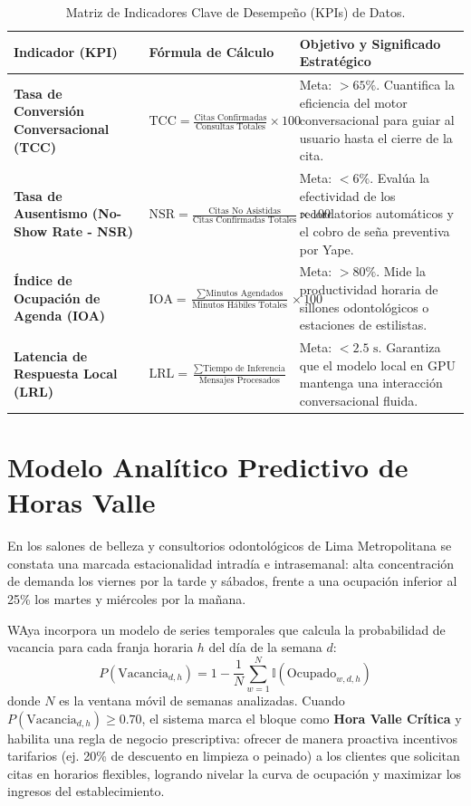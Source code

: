 \documentclass[12pt,a4paper]{report}
\begin{document}
\begin{table}[h!]
\centering
\small
\begin{tabularx}{\textwidth}{|p{3.5cm}|p{4.2cm}|X|}
\hline
\rowcolor{BrandPrimary!20}
\textbf{Indicador (KPI)} & \textbf{Fórmula de Cálculo} & \textbf{Objetivo y Significado Estratégico} \\
\hline
\textbf{Tasa de Conversión Conversacional (TCC)} & 
$\text{TCC} = \frac{\text{Citas Confirmadas}}{\text{Consultas Totales}} \times 100$ & 
Meta: $> 65\%$. Cuantifica la eficiencia del motor conversacional para guiar al usuario hasta el cierre de la cita. \\
\hline
\textbf{Tasa de Ausentismo (No-Show Rate - NSR)} & 
$\text{NSR} = \frac{\text{Citas No Asistidas}}{\text{Citas Confirmadas Totales}} \times 100$ & 
Meta: $< 6\%$. Evalúa la efectividad de los recordatorios automáticos y el cobro de seña preventiva por Yape. \\
\hline
\textbf{Índice de Ocupación de Agenda (IOA)} & 
$\text{IOA} = \frac{\sum \text{Minutos Agendados}}{\text{Minutos Hábiles Totales}} \times 100$ & 
Meta: $> 80\%$. Mide la productividad horaria de sillones odontológicos o estaciones de estilistas. \\
\hline
\textbf{Latencia de Respuesta Local (LRL)} & 
$\text{LRL} = \frac{\sum \text{Tiempo de Inferencia}}{\text{Mensajes Procesados}}$ & 
Meta: $< 2.5\text{ s}$. Garantiza que el modelo local en GPU mantenga una interacción conversacional fluida. \\
\hline
\end{tabularx}
\caption{Matriz de Indicadores Clave de Desempeño (KPIs) de Datos.}
\label{tab:matriz_kpis}
\end{table}

\section{Modelo Analítico Predictivo de Horas Valle}
En los salones de belleza y consultorios odontológicos de Lima Metropolitana se constata una marcada estacionalidad intradía e intrasemanal: alta concentración de demanda los viernes por la tarde y sábados, frente a una ocupación inferior al 25\% los martes y miércoles por la mañana.

WAya incorpora un modelo de series temporales que calcula la probabilidad de vacancia para cada franja horaria $h$ del día de la semana $d$:
\begin{equation}
    P(\text{Vacancia}_{d, h}) = 1 - \frac{1}{N} \sum_{w=1}^{N} \mathbb{I}(\text{Ocupado}_{w, d, h})
\end{equation}
donde $N$ es la ventana móvil de semanas analizadas. Cuando $P(\text{Vacancia}_{d, h}) \ge 0.70$, el sistema marca el bloque como \textbf{Hora Valle Crítica} y habilita una regla de negocio prescriptiva: ofrecer de manera proactiva incentivos tarifarios (ej. 20\% de descuento en limpieza o peinado) a los clientes que solicitan citas en horarios flexibles, logrando nivelar la curva de ocupación y maximizar los ingresos del establecimiento.
\end{document}
